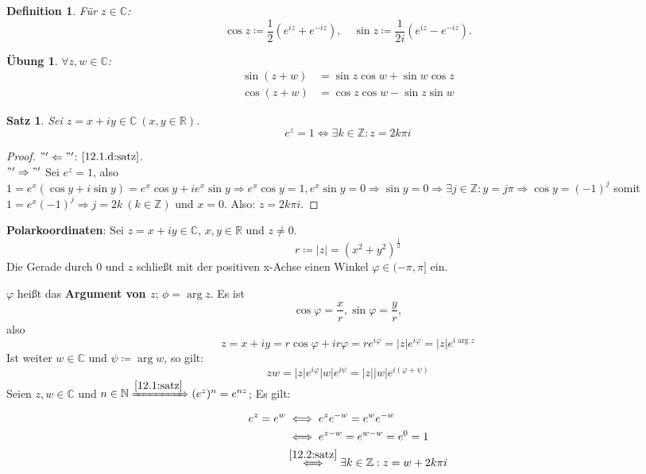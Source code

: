 \documentclass{extreport}
\newcommand{\C}{\mathbb{C}}
\newcommand{\N}{\mathbb{N}}
\newcommand{\R}{\mathbb{R}}
\newcommand{\Z}{\mathbb{Z}}
\theoremstyle{named}
\theoremstyle{dotless}
\newtheorem{satz}[namedtheorem]{Satz}
\newtheorem*{definition}{Definition}
\newtheorem*{uebung}{Übung}
\begin{document}
\begin{definition}
	Für $z \in \C$:
	$$ \cos z \coloneqq \frac{1}{2} \left( e^{iz} + e^{-iz} \right), \quad \sin z \coloneqq \frac{1}{2 i} \left( e^{iz} - e^{-iz} \right). $$
\end{definition}


\begin{uebung}
	$\forall z, w \in \C$:
	\begin{align*}
		\sin (z + w) & = \sin z \cos w + \sin w \cos z \\
		\cos (z + w) & = \cos z \cos w - \sin z \sin w
	\end{align*}	
\end{uebung}


\begin{satz} \label{12.2:satz}
	Sei $z = x + i y \in \C ~(x, y \in \R)$.
	$$ e^{z} = 1 \iff \exists k \in \Z: z = 2 k \pi i $$
\end{satz}

\begin{proof}
	$"' \Leftarrow "'$: $\ref{12.1.d:satz}$. \\
	$"' \Rightarrow "'$ Sei $e^{z} = 1$, also $1 = e^{x} ( \cos y + i \sin y) = e^{x} \cos y + i e^{x} \sin y \Rightarrow e^{x} \cos y = 1, e^{x} \sin y = 0 \Rightarrow \sin y = 0 \Rightarrow \exists j \in \Z: y = j \pi \Rightarrow \cos y = (-1)^{j}$ somit $1 = e^{x} (-1)^{j} \Rightarrow j = 2k ~(k \in \Z)$ und $x = 0$. Also: $z = 2k \pi i$.
\end{proof}

 
\textbf{Polarkoordinaten}: Sei $z = x + iy \in \C$, $x, y \in \R$ und $z \neq 0$.
	$$ r \coloneqq |z| = (x^{2} + y^{2})^{\frac{1}{2}} $$
	Die Gerade durch $0$ und $z$ schließt mit der positiven x-Achse einen Winkel $\varphi \in (-\pi, \pi]$ ein.
	
	$\varphi$ hei{\ss}t das \textbf{Argument von $z$}; $\phi = \arg z$. Es ist
		$$ \cos \varphi = \frac{x}{r}, \sin \varphi = \frac{y}{r}, $$
	also
		$$  z = x + iy = r \cos \varphi + i r \varphi = r e^{i \varphi} = |z| e^{i \varphi} = |z| e^{i \arg z} $$
	Ist weiter $w \in \C$ und $\psi \coloneqq \arg w$, so gilt:
		$$ z w = |z| e^{i \varphi} |w| e^{i \psi} = |z| |w| e^{i(\varphi + \psi)} $$
	Seien $z, w \in \C$ und $n \in \N \xRightarrow[]{\ref{12.1:satz}} (e^{z})^{n} = e^{nz}$; Es gilt:
	\begin{align*}
		e^{z} = e^{w} & \iff e^{z} e^{-w} = e^{w} e^{-w} \\
			& \iff e^{z-w} = e^{w - w} = e^{0} =1 \\
			& \overset{\ref{12.2:satz}}{\iff} \exists k \in \Z: z = w + 2 k \pi i
	\end{align*}
\end{document}
